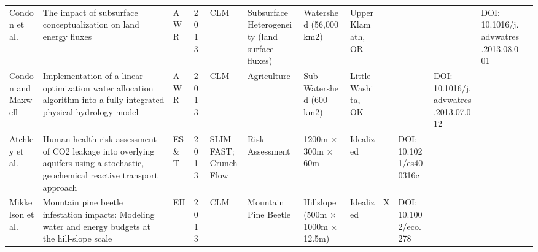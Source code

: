 {\begin{tabular}{ p{1cm} p{2cm} p{0.75cm} p{0.5cm} p{1cm} p{1.5cm} p{1cm} p{1cm} p{0.25cm} p{0.25cm} p{0.25cm} p{0.25cm} p{1cm} }
Condon et al. & The impact of subsurface conceptualization on land energy fluxes & AWR & 2013 & CLM & Subsurface Heterogeneity (land surface fluxes) & Watershed (56,000 km2) & Upper Klamath, OR &  &  &  & DOI: 10.1016/j.advwatres.2013.08.001  \\
Condon and Maxwell & Implementation of a linear optimization water allocation algorithm into a fully integrated physical hydrology model & AWR & 2013 & CLM & Agriculture & Sub-Watershed (600 km2) & Little Washita, OK &  &  & DOI: 10.1016/j.advwatres.2013.07.012   \\
Atchley et al. & Human health risk assessment of CO2 leakage into overlying aquifers using a stochastic, geochemical reactive transport approach & ES\&T & 2013 & SLIM-FAST; CrunchFlow & Risk Assessment & 1200m × 300m × 60m & Idealized &  & DOI: 10.1021/es400316c   \\
Mikkelson et al. & Mountain pine beetle infestation impacts: Modeling water and energy budgets at the hill-slope scale & EH & 2013 & CLM & Mountain Pine Beetle & Hillslope (500m × 1000m × 12.5m) & Idealized & X & DOI: 10.1002/eco.278  \\
\end{tabular}

}
